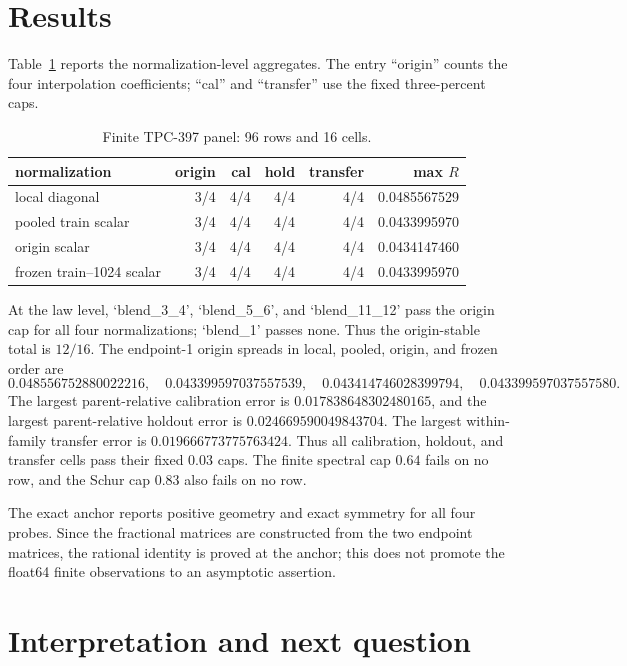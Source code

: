 \documentclass[10pt]{article}
\begin{document}
\section{Results}

Table~\ref{tab:summary} reports the normalization-level aggregates.  The
entry ``origin'' counts the four interpolation coefficients; ``cal'' and
``transfer'' use the fixed three-percent caps.

\begin{table}[t]
\centering
\caption{Finite TPC-397 panel: 96 rows and 16 cells.}
\label{tab:summary}
\small
\begin{tabular}{@{}lrrrrr@{}}
\toprule
normalization & origin & cal & hold & transfer & max $R$\\
\midrule
local diagonal & 3/4 & 4/4 & 4/4 & 4/4 & 0.0485567529\\
pooled train scalar & 3/4 & 4/4 & 4/4 & 4/4 & 0.0433995970\\
origin scalar & 3/4 & 4/4 & 4/4 & 4/4 & 0.0434147460\\
frozen train--1024 scalar & 3/4 & 4/4 & 4/4 & 4/4 & 0.0433995970\\
\bottomrule
\end{tabular}
\end{table}

At the law level, `blend\_3\_4', `blend\_5\_6', and `blend\_11\_12' pass the
origin cap for all four normalizations; `blend\_1' passes none.  Thus the
origin-stable total is $12/16$.  The endpoint-1 origin spreads in local,
pooled, origin, and frozen order are
\[
0.048556752880022216,\quad
0.043399597037557539,\quad
0.043414746028399794,\quad
0.043399597037557580.
\]
The largest parent-relative calibration error is
$0.017838648302480165$, and the largest parent-relative holdout error is
$0.024669590049843704$.  The largest within-family transfer error is
$0.019666773775763424$.  Thus all calibration, holdout, and transfer cells
pass their fixed $0.03$ caps.  The finite spectral cap $0.64$ fails on no row,
and the Schur cap $0.83$ also fails on no row.

The exact anchor reports positive geometry and exact symmetry for all four
probes.  Since the fractional matrices are constructed from the two endpoint
matrices, the rational identity is proved at the anchor; this does not promote
the float64 finite observations to an asymptotic assertion.

\section{Interpretation and next question}
\end{document}
